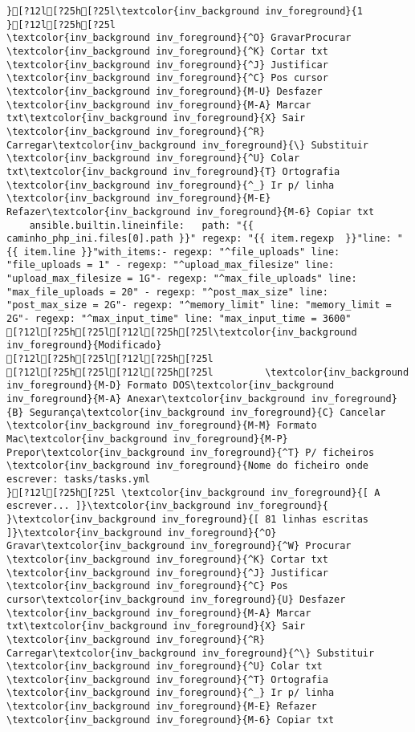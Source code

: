 \documentclass{scrartcl}
\begin{document}
\begin{Verbatim}
}[?12l[?25h[?25l\textcolor{inv_background inv_foreground}{1
}[?12l[?25h[?25l
\textcolor{inv_background inv_foreground}{^O} GravarProcurar      \textcolor{inv_background inv_foreground}{^K} Cortar txt    \textcolor{inv_background inv_foreground}{^J} Justificar    \textcolor{inv_background inv_foreground}{^C} Pos cursor    \textcolor{inv_background inv_foreground}{M-U} Desfazer     \textcolor{inv_background inv_foreground}{M-A} Marcar txt\textcolor{inv_background inv_foreground}{X} Sair    \textcolor{inv_background inv_foreground}{^R} Carregar\textcolor{inv_background inv_foreground}{\} Substituir    \textcolor{inv_background inv_foreground}{^U} Colar txt\textcolor{inv_background inv_foreground}{T} Ortografia    \textcolor{inv_background inv_foreground}{^_} Ir p/ linha   \textcolor{inv_background inv_foreground}{M-E} Refazer\textcolor{inv_background inv_foreground}{M-6} Copiar txt
    ansible.builtin.lineinfile:   path: "{{ caminho_php_ini.files[0].path }}" regexp: "{{ item.regexp  }}"line: "{{ item.line }}"with_items:- regexp: "^file_uploads" line: "file_uploads = 1" - regexp: "^upload_max_filesize" line: "upload_max_filesize = 1G"- regexp: "^max_file_uploads" line: "max_file_uploads = 20" - regexp: "^post_max_size" line: "post_max_size = 2G"- regexp: "^memory_limit" line: "memory_limit = 2G"- regexp: "^max_input_time" line: "max_input_time = 3600"
[?12l[?25h[?25l[?12l[?25h[?25l\textcolor{inv_background inv_foreground}{Modificado}
[?12l[?25h[?25l[?12l[?25h[?25l
[?12l[?25h[?25l[?12l[?25h[?25l         \textcolor{inv_background inv_foreground}{M-D} Formato DOS\textcolor{inv_background inv_foreground}{M-A} Anexar\textcolor{inv_background inv_foreground}{B} Segurança\textcolor{inv_background inv_foreground}{C} Cancelar           \textcolor{inv_background inv_foreground}{M-M} Formato Mac\textcolor{inv_background inv_foreground}{M-P} Prepor\textcolor{inv_background inv_foreground}{^T} P/ ficheiros
\textcolor{inv_background inv_foreground}{Nome do ficheiro onde escrever: tasks/tasks.yml                                                                                           }[?12l[?25h[?25l \textcolor{inv_background inv_foreground}{[ A escrever... ]}\textcolor{inv_background inv_foreground}{          }\textcolor{inv_background inv_foreground}{[ 81 linhas escritas ]}\textcolor{inv_background inv_foreground}{^O} Gravar\textcolor{inv_background inv_foreground}{^W} Procurar      \textcolor{inv_background inv_foreground}{^K} Cortar txt    \textcolor{inv_background inv_foreground}{^J} Justificar    \textcolor{inv_background inv_foreground}{^C} Pos cursor\textcolor{inv_background inv_foreground}{U} Desfazer     \textcolor{inv_background inv_foreground}{M-A} Marcar txt\textcolor{inv_background inv_foreground}{X} Sair    \textcolor{inv_background inv_foreground}{^R} Carregar\textcolor{inv_background inv_foreground}{^\} Substituir    \textcolor{inv_background inv_foreground}{^U} Colar txt     \textcolor{inv_background inv_foreground}{^T} Ortografia    \textcolor{inv_background inv_foreground}{^_} Ir p/ linha   \textcolor{inv_background inv_foreground}{M-E} Refazer      \textcolor{inv_background inv_foreground}{M-6} Copiar txt

\end{Verbatim}
\end{document}
